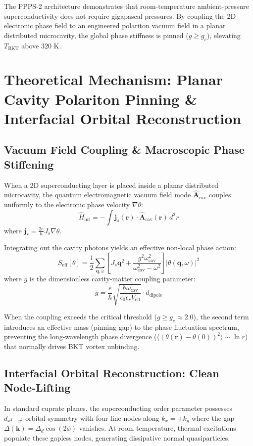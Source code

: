 \documentclass[10pt,twocolumn,letterpaper]{article}
\begin{document}
The PPPS-2 architecture demonstrates that room-temperature ambient-pressure superconductivity does not require gigapascal pressures. By coupling the 2D electronic phase field to an engineered polariton vacuum field in a planar distributed microcavity, the global phase stiffness is pinned ($g \ge g_c$), elevating $T_{\text{BKT}}$ above $320\text{ K}$.

\section{Theoretical Mechanism: Planar Cavity Polariton Pinning \& Interfacial Orbital Reconstruction}

\subsection{Vacuum Field Coupling \& Macroscopic Phase Stiffening}
When a 2D superconducting layer is placed inside a planar distributed microcavity, the quantum electromagnetic vacuum field mode $\hat{\mathbf{A}}_{\text{cav}}$ couples uniformly to the electronic phase velocity $\nabla \theta$:
\begin{equation}
\hat{H}_{\text{int}} = - \int \mathbf{j}_s(\mathbf{r}) \cdot \hat{\mathbf{A}}_{\text{cav}}(\mathbf{r})\, d^2r
\end{equation}
where $\mathbf{j}_s = \frac{2e}{\hbar} J_s \nabla \theta$.

Integrating out the cavity photons yields an effective non-local phase action:
\begin{equation}
S_{\text{eff}}[\theta] = \frac{1}{2} \sum_{\mathbf{q},\omega} \left[ J_s \mathbf{q}^2 + \frac{g^2 \omega_{\text{cav}}^2}{\omega_{\text{cav}}^2 - \omega^2} \right] |\theta(\mathbf{q},\omega)|^2
\end{equation}
where $g$ is the dimensionless cavity-matter coupling parameter:
\begin{equation}
g = \frac{e}{\hbar} \sqrt{\frac{\hbar \omega_{\text{cav}}}{\epsilon_0 \epsilon_r V_{\text{eff}}}} \cdot d_{\text{dipole}}
\end{equation}

When the coupling exceeds the critical threshold ($g \ge g_c \approx 2.0$), the second term introduces an effective mass (pinning gap) to the phase fluctuation spectrum, preventing the long-wavelength phase divergence ($\langle (\theta(\mathbf{r}) - \theta(0))^2 \rangle \sim \ln r$) that normally drives BKT vortex unbinding.

\subsection{Interfacial Orbital Reconstruction: Clean Node-Lifting}
In standard cuprate planes, the superconducting order parameter possesses $d_{x^2-y^2}$ orbital symmetry with four line nodes along $k_x = \pm k_y$ where the gap $\Delta(\mathbf{k}) = \Delta_d \cos(2\phi)$ vanishes. At room temperature, thermal excitations populate these gapless nodes, generating dissipative normal quasiparticles.
\end{document}
